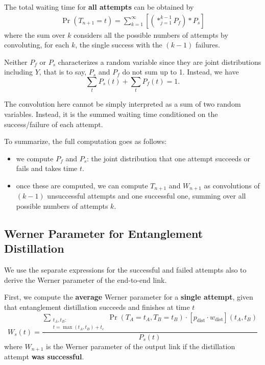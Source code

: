 \documentclass{masterthesis}
\begin{document}
The total waiting time for \textbf{all attempts} can be obtained by
\begin{align}\label{eq:waiting_time_distillation}
    \Pr(T_{n+1} = t) = \sum_{k=1}^{\infty} \left[ \left( \ast_{j=1}^{k-1} P_f \right) \ast P_s \right]
\end{align}
where the sum over $k$ considers all the possible numbers of attempts by convoluting, for each $k$, the single success with the $(k-1)$ failures.

Neither $P_f$ or $P_s$ characterizes a random variable since they are joint distributions including $Y$, that is to say, $P_s$ and $P_f$ do not sum up to 1. Instead, we have
\begin{equation}
    \sum_t P_s(t) + \sum_t P_f(t) = 1 .
\end{equation}

The convolution here cannot be simply interpreted as a sum of two random variables. Instead, it is the summed waiting time conditioned on the success/failure of each attempt.

To summarize, the full computation goes as follows:
\begin{itemize}
    \item we compute $P_f$ and $P_s$: the joint distribution that one attempt succeeds or fails and takes time $t$.
    \item once these are computed, we can compute $T_{n+1}$ and $W_{n+1}$ as convolutions of $(k-1)$ unsuccessful attempts and one successful one, summing over all possible numbers of attempts $k$.
\end{itemize}

\subsection{Werner Parameter for Entanglement Distillation}

We use the separate expressions for the successful and failed attempts also to derive the Werner parameter of the end-to-end link. 

First, we compute the \textbf{average} Werner parameter for a \textbf{single attempt}, given that entanglement distillation succeeds and finishes at time $t$
\begin{equation}
    W_s(t) = \frac{\sum_{\substack{t_A, t_B : \\ t = \max(t_A, t_B) + t_c}} \Pr(T_A = t_A, T_B = t_B) \cdot [p_\text{dist} \cdot w_\text{dist}](t_A, t_B)}{P_s(t)}
\end{equation}
where $W_{n+1}$ is the Werner parameter of the output link if the distillation attempt \textbf{was successful}.
\end{document}
